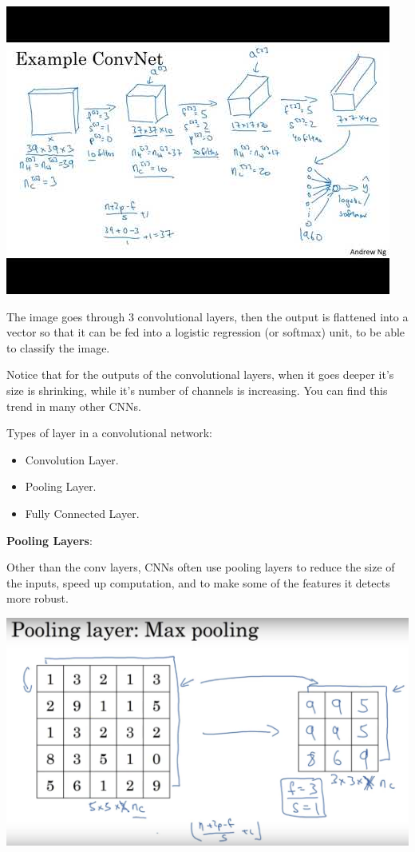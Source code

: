 \documentclass{article}
\begin{document}
\begin{center}
\includegraphics[scale=0.6]{./images/simple_cnn_example.jpg}
\end{center}

\noindent The image goes through 3 convolutional layers, then the output is flattened into a vector so that it can be fed into a logistic regression (or softmax) unit, to be able to classify the image.

\bigskip

\noindent Notice that for the outputs of the convolutional layers, when it goes deeper it's size is shrinking, while it's number of channels is increasing. You can find this trend in many other CNNs.

\bigskip

\noindent Types of layer in a convolutional network:

\begin{itemize}
    \item Convolution Layer.
    \item Pooling Layer.
    \item Fully Connected Layer.
\end{itemize}

\noindent \textbf{Pooling Layers}:

\noindent Other than the conv layers, CNNs often use pooling layers to reduce the size of the inputs, speed up computation, and to make some of the features it detects more robust.

\begin{center}
\includegraphics[scale=0.6]{./images/max_pooling.png}
\end{center}
\end{document}
